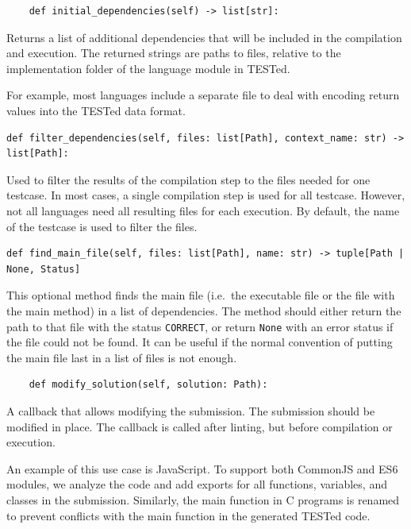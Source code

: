 \documentclass[../main]{subfiles}
\begin{document}
\begin{verbatim}
    def initial_dependencies(self) -> list[str]:
\end{verbatim}

Returns a list of additional dependencies that will be included in the compilation and execution.
The returned strings are paths to files, relative to the implementation folder of the language module in TESTed.

For example, most languages include a separate file to deal with encoding return values into the TESTed data format.

\begin{verbatim}
def filter_dependencies(self, files: list[Path], context_name: str) -> list[Path]:
\end{verbatim}

Used to filter the results of the compilation step to the files needed for one testcase.
In most cases, a single compilation step is used for all testcase.
However, not all languages need all resulting files for each execution.
By default, the name of the testcase is used to filter the files.

\begin{verbatim}
def find_main_file(self, files: list[Path], name: str) -> tuple[Path | None, Status]
\end{verbatim}

This optional method finds the main file (i.e.\ the executable file or the file with the main method) in a list of dependencies.
The method should either return the path to that file with the status \texttt{CORRECT}, or return \texttt{None} with an error status if the file could not be found.
It can be useful if the normal convention of putting the main file last in a list of files is not enough.

\begin{verbatim}
    def modify_solution(self, solution: Path):
\end{verbatim}

A callback that allows modifying the submission.
The submission should be modified in place.
The callback is called after linting, but before compilation or execution.

An example of this use case is JavaScript.
To support both CommonJS and ES6 modules, we analyze the code and add exports for all functions, variables, and classes in the submission.
Similarly, the main function in C programs is renamed to prevent conflicts with the main function in the generated TESTed code.
\end{document}
